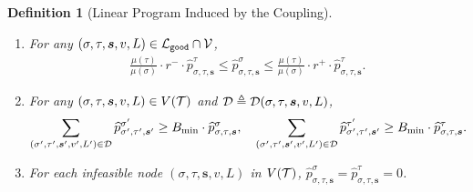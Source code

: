 \documentclass[11pt]{article}
\newtheorem{definition}[theorem]{Definition}
\def\!#1{\mathtt{#1}}
\newcommand{\seqS}{\boldsymbol{s}}
\begin{document}
\begin{definition}[Linear Program Induced by the Coupling]
{\begin{enumerate}
\begin{align}
            \end{align}
            \begin{align}\label{eqn-hat-inner-child-sum2}
                \widehat{p}^{\tau}_{\sigma,\tau, \seqS,e}=\widehat{p}^{\tau\land (e\gets 0)}_{\sigma\land (e\gets 0),\tau\land (e\gets 0), \seqS\circ e}+\widehat{p}^{\tau\land (e\gets 0)}_{\sigma\land (e\gets 1),\tau\land (e\gets 0), \seqS \circ e}, \quad  \widehat{p}^{\tau}_{\sigma,\tau,\seqS,e}=\widehat{p}^{\tau\land (e\gets 1)}_{\sigma\land (e\gets 1),\tau\land (e\gets 1),\seqS\circ e}.
            \end{align}
            Otherwise, 
            \begin{align}\label{eqn-hat-inner-child-sum3}
                 \widehat{p}^{\sigma}_{\sigma,\tau,\seqS,e}= \widehat{p}^{\sigma \land (e\gets 0)}_{\sigma\land (e\gets 0),\tau\land (e\gets 0),\seqS\circ e}+ \widehat{p}^{\sigma\land (e\gets 0)}_{\sigma\land (e\gets 0),\tau\land (e\gets 1), \seqS\circ e}, \quad  \widehat{p}^{\sigma}_{\sigma,\tau,\seqS,e}=\widehat{p}^{\sigma\land (e\gets 1)}_{\sigma\land (e\gets 1),\tau\land (e\gets 1), \seqS\circ e},
            \end{align}
            \begin{align}\label{eqn-hat-inner-child-sum4}
                 \widehat{p}^{\tau}_{\sigma,\tau,\seqS,e}= \widehat{p}^{\tau\land (e\gets 0)}_{\sigma\land (e\gets 0),\tau\land (e\gets 0),\seqS\circ e}, \quad   \widehat{p}^{\tau}_{\sigma,\tau,\seqS,e}= \widehat{p}^{\tau\land (e\gets 1)}_{\sigma\land (e\gets 0),\tau\land (e\gets 1),\seqS\circ e} +  \widehat{p}^{\tau \land (e\gets 1)}_{\sigma\land (e\gets 1),\tau\land (e\gets 1),\seqS\circ e}.
            \end{align}
        \item For any $(\sigma,\tau,\seqS,v,L)\in \+L_{\!{good}}\cap \+V$,
            \begin{align}\label{eqn-hat-ratio}
                 \frac{ \mu(\tau)}{ \mu(\sigma)}\cdot r^-\cdot {\widehat{p}^{\tau}_{\sigma,\tau, \seqS}}\leq {\widehat{p}^{\sigma}_{\sigma,\tau, \seqS}}\leq  \frac{ \mu(\tau)}{ \mu(\sigma)}\cdot  r^+ \cdot{\widehat{p}^{\tau}_{\sigma,\tau, \seqS}}.
            \end{align}
        \item For any $(\sigma,\tau, \seqS,v,L)\in V(\+T)$ and $\+D \triangleq \+D(\sigma,\tau, \seqS,v,L)$,
           \begin{align}\label{eqn-hat-error-bound}
               \sum_{(\sigma',\tau',\seqS',v',L')\in \+D}\widehat{p}^{\sigma'}_{\sigma',\tau', \seqS'} \geq  B_{\min} \cdot \widehat{p}^{\sigma}_{\sigma,\tau, \seqS}, \quad \sum_{(\sigma',\tau',\seqS',v',L')\in \+D}\widehat{p}^{\tau'}_{\sigma',\tau',\seqS'}\geq  B_{\min} \cdot \widehat{p}^{\tau}_{\sigma,\tau,\seqS}.
           \end{align}
        \item  For each infeasible node $(\sigma, \tau, \seqS, v, L)$ in $V(\mathcal{T})$, $ \widehat{p}^{\sigma}_{\sigma,\tau, \seqS}= \widehat{p}^{\tau}_{\sigma,\tau, \seqS}=0$. 
    \end{enumerate}
}
\end{definition}
\end{document}
